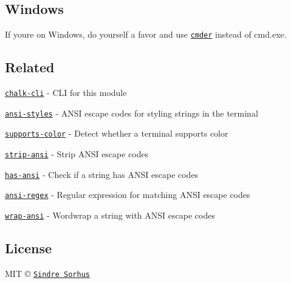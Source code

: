 \subsection*{Windows}

If you\textquotesingle{}re on Windows, do yourself a favor and use \href{http://bliker.github.io/cmder/}{\tt {\ttfamily cmder}} instead of {\ttfamily cmd.\+exe}.

\subsection*{Related}


\begin{DoxyItemize}
\item \href{https://github.com/chalk/chalk-cli}{\tt chalk-\/cli} -\/ C\+LI for this module
\item \href{https://github.com/chalk/ansi-styles/}{\tt ansi-\/styles} -\/ A\+N\+SI escape codes for styling strings in the terminal
\item \href{https://github.com/chalk/supports-color/}{\tt supports-\/color} -\/ Detect whether a terminal supports color
\item \href{https://github.com/chalk/strip-ansi}{\tt strip-\/ansi} -\/ Strip A\+N\+SI escape codes
\item \href{https://github.com/chalk/has-ansi}{\tt has-\/ansi} -\/ Check if a string has A\+N\+SI escape codes
\item \href{https://github.com/chalk/ansi-regex}{\tt ansi-\/regex} -\/ Regular expression for matching A\+N\+SI escape codes
\item \href{https://github.com/chalk/wrap-ansi}{\tt wrap-\/ansi} -\/ Wordwrap a string with A\+N\+SI escape codes
\end{DoxyItemize}

\subsection*{License}

M\+IT © \href{http://sindresorhus.com}{\tt Sindre Sorhus} 
